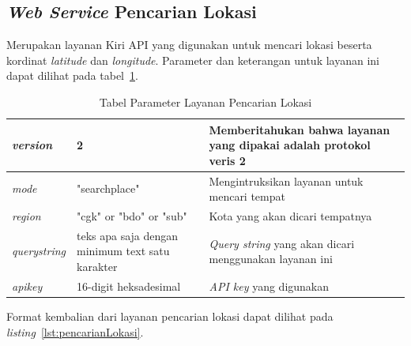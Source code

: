 \subsection{\textit{Web Service} Pencarian Lokasi}
\label{subsec:Pencarian Lokasi Service}
\hspace{0.5cm} Merupakan layanan Kiri API yang digunakan untuk mencari lokasi beserta kordinat \textit{latitude} dan \textit{longitude}. Parameter dan keterangan untuk layanan ini dapat dilihat pada tabel~\ref{tab:pencarianLokasi}.

\begin{table}[H]
	\centering
		\begin{tabular}{ |p{2cm}|p{4cm}|p{8cm}| }
			\hline
			\textit{version} & 2 & Memberitahukan bahwa layanan yang dipakai adalah protokol veris 2 \\ \hline
			\textit{mode} & "searchplace" & Mengintruksikan layanan untuk mencari tempat \\ \hline
			\textit{region} & "cgk" or "bdo" or "sub" & Kota yang akan dicari tempatnya \\ \hline
			\textit{querystring} & teks apa saja dengan minimum text satu karakter & \textit{Query string} yang akan dicari menggunakan  layanan ini \\ \hline
			\textit{apikey} & 16-digit heksadesimal & \textit{API key} yang digunakan \\ \hline
			\hline
		\end{tabular}
	\caption{Tabel Parameter Layanan Pencarian Lokasi}
	\label{tab:pencarianLokasi}
\end{table}

\vspace{5mm}
Format kembalian dari layanan pencarian lokasi dapat dilihat pada \textit{listing}~\ref{lst:pencarianLokasi}.

